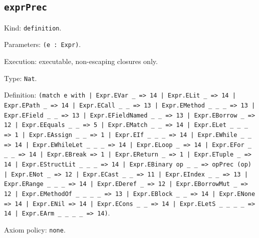 \documentclass[11pt]{article}
\begin{document}
\subsection*{\texttt{exprPrec}}
\noindent Kind: \texttt{definition}.\par
\noindent Parameters: \texttt{(e : Expr)}.\par
\noindent Execution: executable, non-escaping closures only.\par
\noindent Type: \texttt{Nat}.\par
\noindent Definition: \texttt{(match e with | Expr.EVar \_ => 14 | Expr.ELit \_ => 14 | Expr.EPath \_ => 14 | Expr.ECall \_ \_ => 13 | Expr.EMethod \_ \_ \_ => 13 | Expr.EField \_ \_ => 13 | Expr.EFieldNamed \_ \_ => 13 | Expr.EBorrow \_ => 12 | Expr.EEquals \_ \_ => 5 | Expr.EMatch \_ \_ => 14 | Expr.ELet \_ \_ \_ => 1 | Expr.EAssign \_ \_ => 1 | Expr.EIf \_ \_ \_ => 14 | Expr.EWhile \_ \_ => 14 | Expr.EWhileLet \_ \_ \_ => 14 | Expr.ELoop \_ => 14 | Expr.EFor \_ \_ \_ => 14 | Expr.EBreak => 1 | Expr.EReturn \_ => 1 | Expr.ETuple \_ => 14 | Expr.EStructLit \_ \_ \_ => 14 | Expr.EBinary op \_ \_ => opPrec (op) | Expr.ENot \_ => 12 | Expr.ECast \_ \_ => 11 | Expr.EIndex \_ \_ => 13 | Expr.ERange \_ \_ \_ => 14 | Expr.EDeref \_ => 12 | Expr.EBorrowMut \_ => 12 | Expr.EMethodOf \_ \_ \_ \_ => 13 | Expr.EBlock \_ \_ => 14 | Expr.ENone => 14 | Expr.ENil => 14 | Expr.ECons \_ \_ => 14 | Expr.ELetS \_ \_ \_ \_ => 14 | Expr.EArm \_ \_ \_ \_ => 14)}.\par
\noindent Axiom policy: \texttt{none}.\par
\end{document}

